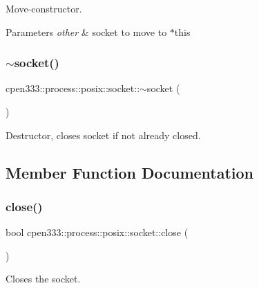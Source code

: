 Move-\/constructor. 


\begin{DoxyParams}{Parameters}
{\em other} & socket to move to $\ast$this \\
\hline
\end{DoxyParams}
\mbox{\label{classcpen333_1_1process_1_1posix_1_1socket_ad5dc9ffd6311247114538ec84f2c08a0}} 
\subsubsection{\texorpdfstring{$\sim$socket()}{~socket()}}
{\footnotesize\ttfamily cpen333\+::process\+::posix\+::socket\+::$\sim$socket (\begin{DoxyParamCaption}{ }\end{DoxyParamCaption})\hspace{0.3cm}{\ttfamily [inline]}}



Destructor, closes socket if not already closed. 



\subsection{Member Function Documentation}
\mbox{\label{classcpen333_1_1process_1_1posix_1_1socket_a37ac1c8f8ba6dec89066dc1721d0bb0c}} 
\subsubsection{\texorpdfstring{close()}{close()}}
{\footnotesize\ttfamily bool cpen333\+::process\+::posix\+::socket\+::close (\begin{DoxyParamCaption}{ }\end{DoxyParamCaption})\hspace{0.3cm}{\ttfamily [inline]}}



Closes the socket. 

